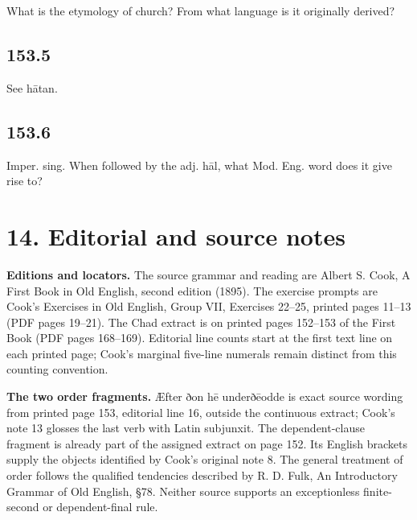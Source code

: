 What is the etymology of church? From what language is it originally derived?

\subsection*{153.5}

See hātan.

\subsection*{153.6}

Imper. sing. When followed by the adj. hāl, what Mod. Eng. word does it give rise to?

\section*{14. Editorial and source notes}

\fontsize{10}{12}\selectfont
\textbf{Editions and locators.} The source grammar and reading are Albert S. Cook, A First Book in Old English, second edition (1895). The exercise prompts are Cook’s Exercises in Old English, Group VII, Exercises 22–25, printed pages 11–13 (PDF pages 19–21). The Chad extract is on printed pages 152–153 of the First Book (PDF pages 168–169). Editorial line counts start at the first text line on each printed page; Cook’s marginal five-line numerals remain distinct from this counting convention.

\textbf{The two order fragments.} Æfter ðon hē underðēodde is exact source wording from printed page 153, editorial line 16, outside the continuous extract; Cook’s note 13 glosses the last verb with Latin subjunxit. The dependent-clause fragment is already part of the assigned extract on page 152. Its English brackets supply the objects identified by Cook’s original note 8. The general treatment of order follows the qualified tendencies described by R. D. Fulk, An Introductory Grammar of Old English, §78. Neither source supports an exceptionless finite-second or dependent-final rule.

